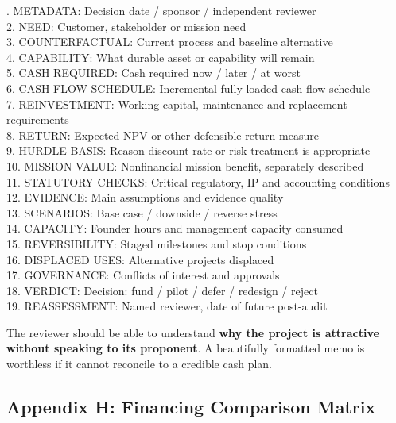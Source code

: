 \begin{tcolorbox}[colback=BayesCanvas,colframe=BayesDark,arc=1mm,title=\textbf{Appendix G: Investment Approval Memorandum Template}]
\scriptsize{}. METADATA: Decision date / sponsor / independent reviewer\\
2. NEED: Customer, stakeholder or mission need\\
3. COUNTERFACTUAL: Current process and baseline alternative\\
4. CAPABILITY: What durable asset or capability will remain\\
5. CASH REQUIRED: Cash required now / later / at worst\\
6. CASH-FLOW SCHEDULE: Incremental fully loaded cash-flow schedule\\
7. REINVESTMENT: Working capital, maintenance and replacement requirements\\
8. RETURN: Expected NPV or other defensible return measure\\
9. HURDLE BASIS: Reason discount rate or risk treatment is appropriate\\
10. MISSION VALUE: Nonfinancial mission benefit, separately described\\
11. STATUTORY CHECKS: Critical regulatory, IP and accounting conditions\\
12. EVIDENCE: Main assumptions and evidence quality\\
13. SCENARIOS: Base case / downside / reverse stress\\
14. CAPACITY: Founder hours and management capacity consumed\\
15. REVERSIBILITY: Staged milestones and stop conditions\\
16. DISPLACED USES: Alternative projects displaced\\
17. GOVERNANCE: Conflicts of interest and approvals\\
18. VERDICT: Decision: fund / pilot / defer / redesign / reject\\
19. REASSESSMENT: Named reviewer, date of future post-audit
\end{tcolorbox}

The reviewer should be able to understand \textbf{why the project is attractive without speaking to its proponent}. A beautifully formatted memo is worthless if it cannot reconcile to a credible cash plan.

\subsection{Appendix H: Financing Comparison Matrix}

